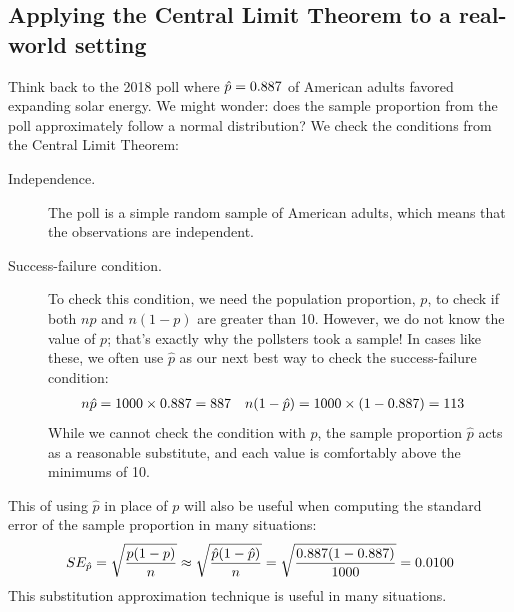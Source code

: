 

\subsection{Applying the Central Limit Theorem to a real-world setting}

Think back to the 2018 poll where
$\hat{p} = 0.887{}$ of American adults favored
expanding solar energy. We might wonder: does the sample
proportion from the poll approximately follow a normal
distribution?
We check the conditions from the Central Limit Theorem:
\begin{description}
\item[Independence.] The poll is a simple random sample of
    American adults, which means that the observations are
    independent.
\item[Success-failure condition.] To check this condition,
    we need the population proportion, $p$, to check if both
    $np$ and $n(1-p)$ are greater than 10. However, we do not
    know the value of $p$; that's exactly why the pollsters
    took a sample! In cases like these, we often use $\hat{p}$
    as our next best way to check the success-failure condition:
    \begin{align*}
    n\hat{p} &= 1000{} \times 0.887{}
        = 887{}
    &n (1 - \hat{p}) &= 1000{} \times (1 - 0.887{})
        = 113{}
    \end{align*}
    While we cannot check the condition with $p$,
    the sample proportion $\hat{p}$ acts as
    a reasonable substitute, and each value is comfortably
    above the minimums of 10.
\end{description}

This  of using $\hat{p}$ in
place of $p$ will also be useful when computing the standard error
of the sample proportion in many situations:
\begin{align*}
SE_{\hat{p}}
    = \sqrt{\frac{p (1 - p)}{n}}
    \approx \sqrt{\frac{\hat{p} (1 - \hat{p})}{n}}
    = \sqrt{\frac{0.887{}
        (1 - 0.887{})}{1000{}}}
    = 0.0100{}
\end{align*}
This substitution approximation technique is useful in many
situations.


